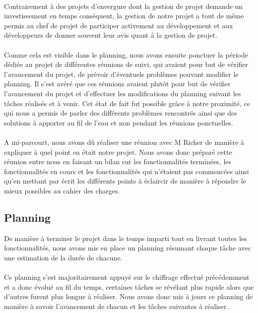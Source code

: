 \documentclass[a4paper,11pt]{article}
\begin{document}
\paragraph{} Contrairement à des projets d'envergure dont la gestion de projet demande un investissement en temps conséquent, la gestion de notre projet a tout de même permis au chef de projet de participer activement au développement et aux développeurs de donner souvent leur avis quant à la gestion de projet.

\paragraph{} Comme cela est visible dans le planning, nous avons ensuite ponctuer la période dédiée au projet de différentes réunions de suivi, qui avaient pour but de vérifier l'avancement du projet, de prévoir d’éventuels problèmes pouvant modifier le planning. Il s'est avéré que ces réunions avaient plutôt pour but de vérifier l'avancement du projet et d'effectuer les modifications du planning suivant les tâches réalisés et à venir. Cet état de fait fut possible grâce à notre proximité, ce qui nous a permis de parler des différents problèmes rencontrés ainsi que des solutions à apporter au fil de l'eau et non pendant les réunions ponctuelles.

\paragraph{} A mi-parcourt, nous avons dû réaliser une réunion avec M Richer de manière à expliquer à quel point en était notre projet. Nous avons donc préparé cette réunion entre nous en faisant un bilan sur les fonctionnalités terminées, les fonctionnalités en cours et les fonctionnalités qui n'étaient pas commencées ainsi qu'en mettant par écrit les différents points à éclaircir de manière à répondre le mieux possibles au cahier des charges.

\subsection{Planning}
De manière à terminer le projet dans le temps imparti tout en livrant toutes les fonctionnalités, nous avons mis en place un planning résumant chaque tâche avec une estimation de la durée de chacune.

\paragraph{} Ce planning s'est majoritairement appuyé sur le chiffrage effectué précédemment et a donc évolué au fil du temps, certaines tâches se révélant plus rapide alors que d'autres furent plus longue à réaliser. Nous avons donc mis à jours ce planning de manière à savoir l'avancement de chacun et les tâches suivantes à réaliser.
\end{document}
